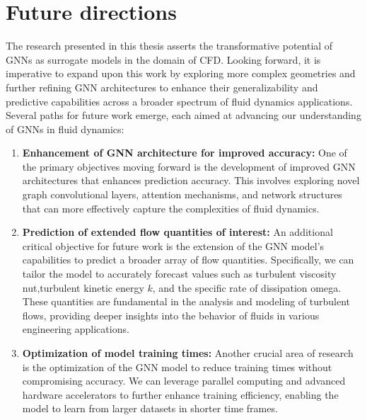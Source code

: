 \section{Future directions}

The research presented in this thesis asserts the transformative potential of GNNs as surrogate models in the domain of CFD. Looking forward, it is imperative to expand upon this work by exploring more complex geometries and further refining GNN architectures to enhance their generalizability and predictive capabilities across a broader spectrum of fluid dynamics applications. Several paths for future work emerge, each aimed at advancing our understanding of GNNs in fluid dynamics:

\begin{enumerate}

    \item \textbf{Enhancement of GNN architecture for improved accuracy:} One of the primary objectives moving forward is the development of  improved GNN architectures that enhances prediction accuracy. This involves exploring novel graph convolutional layers, attention mechanisms, and network structures that can more effectively capture the complexities of fluid dynamics. 
    \item \textbf{Prediction of extended flow quantities of interest:} An additional critical objective for future work is the extension of the GNN model's capabilities to predict a broader array of flow quantities. Specifically, we can tailor the model to accurately forecast values such as turbulent viscosity \gls{nut},turbulent kinetic energy $k$, and the specific rate of dissipation \gls{omega}. These quantities are fundamental in the analysis and modeling of turbulent flows, providing deeper insights into the behavior of fluids in various engineering applications.    
    \item \textbf{Optimization of model training times:} Another crucial area of research is the optimization of the GNN model to reduce training times without compromising accuracy. We can leverage parallel computing and advanced hardware accelerators to further enhance training efficiency, enabling the model to learn from larger datasets in shorter time frames.
    

\end{enumerate}
